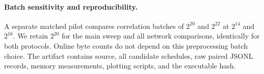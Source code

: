 \paragraph{Batch sensitivity and reproducibility.}
A separate matched pilot compares correlation batches of $2^{20}$ and $2^{22}$
at $2^{14}$ and $2^{16}$. \packedBatchStatement{}
We retain $2^{20}$ for the main sweep
and all network comparisons, identically for both protocols.
Online byte counts do not depend on this preprocessing batch choice.
The artifact contains source, all candidate schedules, raw paired JSONL records,
memory measurements, plotting scripts, and the executable hash.
\clearpage





